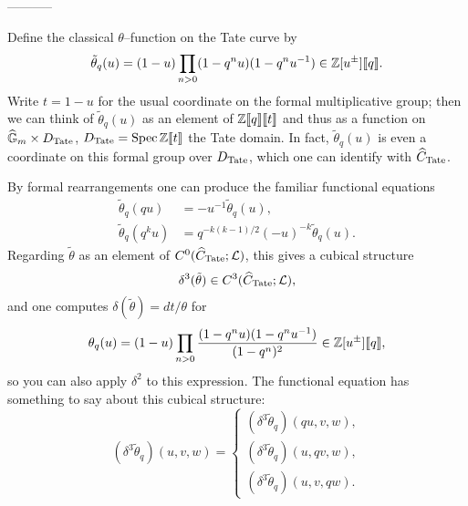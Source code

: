 -----------

Define the classical $\theta$--function on the Tate curve by \[\tilde \theta_q(u) = (1 - u) \prod_{n > 0} (1 - q^n u)(1 - q^nu^{-1}) \in \mathbb Z[u^{\pm}]\llbracket q \rrbracket.\]  Write $t = 1-u$ for the usual coordinate on the formal multiplicative group; then we can think of $\tilde \theta_q(u)$ as an element of $\mathbb Z\llbracket q\rrbracket\llbracket t\rrbracket$ and thus as a function on $\widehat{\mathbb G}_m \times D_{\mathrm{Tate}}$, $D_{\mathrm{Tate}} = \operatorname{Spec} \mathbb Z\llbracket t \rrbracket$ the Tate domain.  In fact, $\tilde\theta_q(u)$ is even a coordinate on this formal group over $D_{\mathrm{Tate}}$, which one can identify with $\widehat C_{\mathrm{Tate}}$.

By formal rearrangements one can produce the familiar functional equations
\begin{align*}
\tilde \theta_q(qu) & = -u^{-1} \tilde\theta_q(u), \\
\tilde \theta_q(q^k u) & = q^{-k(k-1)/2} (-u)^{-k} \tilde\theta_q(u).
\end{align*}
Regarding $\tilde\theta$ as an element of $C^0(\widehat C_{\mathrm{Tate}}; \mathcal{L})$, this gives a cubical structure \[\delta^3(\tilde\theta) \in C^3(\widehat C_{\mathrm{Tate}}; \mathcal{L}),\] and one computes $\delta(\tilde\theta) = dt/\theta$ for \[\theta_q(u) = (1 - u) \prod_{n > 0} \frac{(1 - q^nu)(1 - q^n u^{-1})}{(1 - q^n)^2} \in \mathbb Z[u^\pm]\llbracket q \rrbracket,\] so you can also apply $\delta^2$ to this expression.  The functional equation has something to say about this cubical structure: \[(\delta^3 \tilde\theta_q)(u, v, w) = \begin{cases} (\delta^3 \tilde\theta_q)(qu, v, w), \\ (\delta^3 \tilde\theta_q)(u, qv, w), \\ (\delta^3 \tilde\theta_q)(u, v, qw). \end{cases}\]

